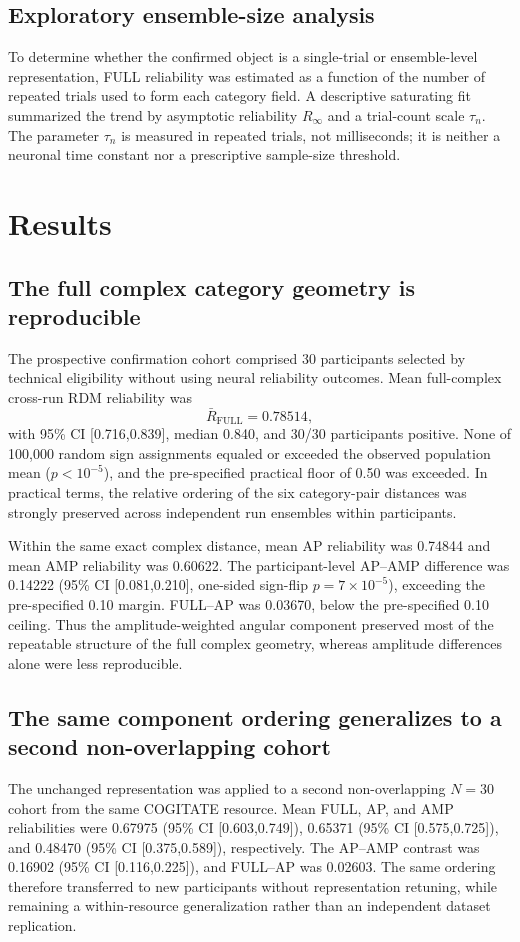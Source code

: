 \documentclass[11pt]{article}
\newcommand{\RFULL}{R_{\mathrm{FULL}}}
\begin{document}
\subsection{Exploratory ensemble-size analysis}
To determine whether the confirmed object is a single-trial or ensemble-level representation, FULL reliability was estimated as a function of the number of repeated trials used to form each category field. A descriptive saturating fit summarized the trend by asymptotic reliability $R_\infty$ and a trial-count scale $\tau_n$. The parameter $\tau_n$ is measured in repeated trials, not milliseconds; it is neither a neuronal time constant nor a prescriptive sample-size threshold.

\section{Results}
\subsection{The full complex category geometry is reproducible}
The prospective confirmation cohort comprised 30 participants selected by technical eligibility without using neural reliability outcomes. Mean full-complex cross-run RDM reliability was
\begin{equation}
\bar\RFULL=0.78514,
\end{equation}
with 95\% CI [0.716,0.839], median 0.840, and 30/30 participants positive. None of 100,000 random sign assignments equaled or exceeded the observed population mean ($p<10^{-5}$), and the pre-specified practical floor of 0.50 was exceeded. In practical terms, the relative ordering of the six category-pair distances was strongly preserved across independent run ensembles within participants.

Within the same exact complex distance, mean AP reliability was 0.74844 and mean AMP reliability was 0.60622. The participant-level AP--AMP difference was 0.14222 (95\% CI [0.081,0.210], one-sided sign-flip $p=7\times10^{-5}$), exceeding the pre-specified 0.10 margin. FULL--AP was 0.03670, below the pre-specified 0.10 ceiling. Thus the amplitude-weighted angular component preserved most of the repeatable structure of the full complex geometry, whereas amplitude differences alone were less reproducible.

\subsection{The same component ordering generalizes to a second non-overlapping cohort}
The unchanged representation was applied to a second non-overlapping $N=30$ cohort from the same COGITATE resource. Mean FULL, AP, and AMP reliabilities were 0.67975 (95\% CI [0.603,0.749]), 0.65371 (95\% CI [0.575,0.725]), and 0.48470 (95\% CI [0.375,0.589]), respectively. The AP--AMP contrast was 0.16902 (95\% CI [0.116,0.225]), and FULL--AP was 0.02603. The same ordering therefore transferred to new participants without representation retuning, while remaining a within-resource generalization rather than an independent dataset replication.
\end{document}
